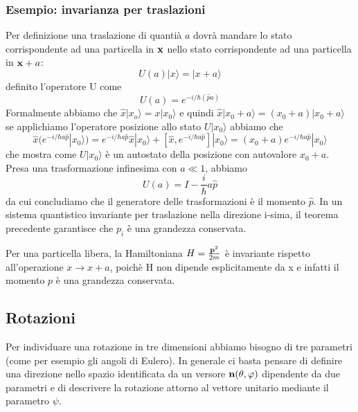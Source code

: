 \subsubsection{Esempio: invarianza per traslazioni}
Per definizione una traslazione di quanti\`a $a$ dovr\`a mandare lo stato corrispondente ad una particella in $\bold{x}$ nello stato corrispondente ad una particella in $\bold{x} + a$:
\begin{equation*}
	U(a)|x \rangle = |x+a \rangle 
\end{equation*}
definito l'operatore U come 
\begin{equation*}
	U(a) = e^{-i /\hbar (\hat{p}a) }
\end{equation*}
Formalmente abbiamo che $\hat{x}|x_o \rangle = x |x_0 \rangle$ e quindi $\hat{x}|x_0 +a\rangle = (x_0 + a)|x_0 +a \rangle $ se applichiamo l'operatore posizione allo stato $U|x_0 \rangle$ abbiamo che
\begin{equation*}
	\hat{x} (e^{-i/ \hbar a \hat{p}}|x_0\rangle ) = e^{-i/\hbar a \hat{p}}\hat{x}|x_0 \rangle + [\hat{x},e^{-i/\hbar a \hat{p}}]|x_0\rangle  = (x_0+a)e^{-i/\hbar a \hat{p}}|x_0 \rangle 
\end{equation*}
che mostra come $U|x_0 \rangle$ \`e un autostato della posizione con autovalore $x_0+a$. Presa una trasformazione infinesima con $a \ll 1$, abbiamo
\begin{equation*}
	U(a) = I - \frac{i}{\hbar}a\hat{p}
\end{equation*}
da cui concludiamo che il generatore delle trasformazioni \`e il momento $\hat{p}$. In un sistema quantistico invariante per traslazione nella direzione i-sima, il teorema precedente garantisce che $p_i$ \`e una grandezza conservata. 

Per una particella libera, la Hamiltoniana $H = \frac{\bold{p}^2}{2m}$ \`e invariante rispetto all'operazione $x \to x+a$, poich\`e H non dipende esplicitamente da x e infatti il momento $p$ \`e una grandezza conservata.
\subsection{Rotazioni }
Per individuare una rotazione in tre dimensioni abbiamo bisogno di tre parametri (come per esempio gli angoli di Eulero). In generale ci basta pensare di definire una direzione nello spazio identificata da un versore $\bold{n}(\theta,\varphi)$ dipendente da due parametri e di descrivere la rotazione attorno al vettore unitario mediante il parametro $\psi$. 

